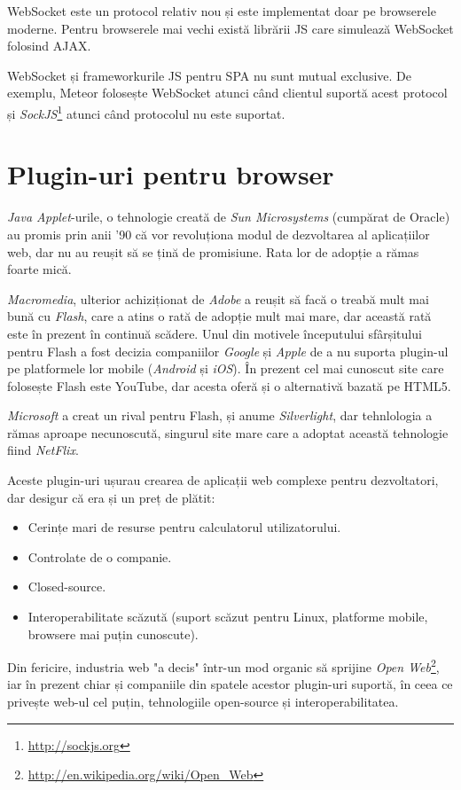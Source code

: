 WebSocket este un protocol relativ nou și este implementat doar pe browserele moderne.
Pentru browserele mai vechi există librării JS care simulează WebSocket folosind
AJAX.

WebSocket și frameworkurile JS pentru SPA nu sunt mutual
exclusive. De exemplu, Meteor folosește WebSocket atunci când clientul suportă
acest protocol și \emph{SockJS}\footnote{\url{http://sockjs.org}} atunci când protocolul 
nu este suportat.

\section{Plugin-uri pentru browser}
\emph{Java Applet}-urile, o tehnologie creată de \emph{Sun Microsystems} 
(cumpărat de Oracle) au promis prin anii '90 că vor revoluționa modul de dezvoltarea
al aplicațiilor web, dar nu au reușit să se țină de promisiune. Rata lor de adopție
a rămas foarte mică.

\emph{Macromedia}, ulterior achiziționat de \emph{Adobe} a
reușit să facă o treabă mult mai bună cu \emph{Flash}, care a atins o rată de
adopție mult mai mare, dar această rată este în prezent în continuă scădere. Unul
din motivele începutului sfârșitului pentru Flash a fost decizia companiilor
\emph{Google} și \emph{Apple} de a nu suporta plugin-ul pe platformele lor mobile
(\emph{Android} și \emph{iOS}). În prezent cel mai cunoscut site care folosește
Flash este YouTube, dar acesta oferă și o alternativă bazată pe HTML5.

\emph{Microsoft} a creat un rival pentru Flash, și anume \emph{Silverlight},
dar tehnlologia a rămas aproape necunoscută, singurul site mare care a adoptat
această tehnologie fiind \emph{NetFlix}.

Aceste plugin-uri ușurau crearea de aplicații web complexe pentru dezvoltatori,
dar desigur că era și un preț de plătit:
\begin{itemize}
\item Cerințe mari de resurse pentru calculatorul utilizatorului.
\item Controlate de o companie.
\item Closed-source.
\item Interoperabilitate scăzută (suport scăzut pentru Linux, platforme mobile,
      browsere mai puțin cunoscute).
\end{itemize}
Din fericire, industria web "a decis" într-un mod organic să sprijine 
\emph{Open Web}\footnote{\url{http://en.wikipedia.org/wiki/Open\_Web}}, iar în prezent 
chiar și companiile din spatele acestor plugin-uri suportă,
în ceea ce privește web-ul cel puțin, tehnologiile open-source
și interoperabilitatea.


